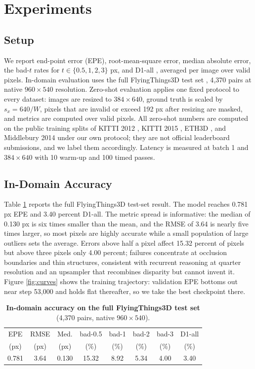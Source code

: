 \documentclass[conference]{IEEEtran}
\begin{document}
\section{Experiments}
\label{sec:exp}

\subsection{Setup}
We report end-point error (EPE), root-mean-square error, median absolute error, the bad-$t$ rates for $t \in \{0.5,1,2,3\}$ px, and D1-all \cite{menze2015kitti}, averaged per image over valid pixels. In-domain evaluation uses the full FlyingThings3D test set \cite{mayer2016sceneflow}, 4{,}370 pairs at native $960\times 540$ resolution. Zero-shot evaluation applies one fixed protocol to every dataset: images are resized to $384\times 640$, ground truth is scaled by $s_x = 640/W$, pixels that are invalid or exceed 192 px after resizing are masked, and metrics are computed over valid pixels. All zero-shot numbers are computed on the public training splits of KITTI 2012 \cite{geiger2012kitti}, KITTI 2015 \cite{menze2015kitti}, ETH3D \cite{schops2017eth3d}, and Middlebury 2014 \cite{scharstein2014middlebury} under our own protocol; they are not official leaderboard submissions, and we label them accordingly. Latency is measured at batch 1 and $384\times 640$ with 10 warm-up and 100 timed passes.

\subsection{In-Domain Accuracy}
Table \ref{tab:indomain} reports the full FlyingThings3D test-set result. The model reaches 0.781 px EPE and 3.40 percent D1-all. The metric spread is informative: the median of 0.130 px is six times smaller than the mean, and the RMSE of 3.64 is nearly five times larger, so most pixels are highly accurate while a small population of large outliers sets the average. Errors above half a pixel affect 15.32 percent of pixels but above three pixels only 4.00 percent; failures concentrate at occlusion boundaries and thin structures, consistent with recurrent reasoning at quarter resolution and an upsampler that recombines disparity but cannot invent it. Figure \ref{fig:curves} shows the training trajectory: validation EPE bottoms out near step 53{,}000 and holds flat thereafter, so we take the best checkpoint there.

\begin{table}[!htbp]
\centering
\caption{\textbf{In-domain accuracy on the full FlyingThings3D test set} (4{,}370 pairs, native $960\times 540$).}
\label{tab:indomain}
\footnotesize
\setlength{\tabcolsep}{3.6pt}
\begin{tabular}{cccccccc}
\toprule
EPE & RMSE & Med. & bad-0.5 & bad-1 & bad-2 & bad-3 & D1-all\\
(px) & (px) & (px) & (\%) & (\%) & (\%) & (\%) & (\%)\\
\midrule
0.781 & 3.64 & 0.130 & 15.32 & 8.92 & 5.34 & 4.00 & 3.40\\
\bottomrule
\end{tabular}
\end{table}
\end{document}
